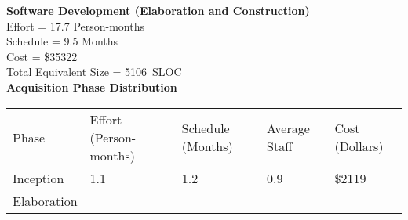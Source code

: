 \textbf{Software Development (Elaboration and
Construction)}\\[2\baselineskip]Effort = 17.7 Person-months\\
Schedule = 9.5 Months\\
Cost = \$35322\\[2\baselineskip]Total Equivalent Size =
5106~SLOC\\[2\baselineskip]\textbf{Acquisition Phase Distribution}\\
{ }

\begin{longtable}[c]{@{}lllll@{}}
\toprule
\begin{minipage}[t]{0.17\columnwidth}\raggedright\strut
Phase
\strut\end{minipage} &
\begin{minipage}[t]{0.17\columnwidth}\raggedright\strut
Effort (Person-months)
\strut\end{minipage} &
\begin{minipage}[t]{0.17\columnwidth}\raggedright\strut
Schedule (Months)
\strut\end{minipage} &
\begin{minipage}[t]{0.17\columnwidth}\raggedright\strut
Average Staff
\strut\end{minipage} &
\begin{minipage}[t]{0.17\columnwidth}\raggedright\strut
Cost (Dollars)
\strut\end{minipage}\tabularnewline
\begin{minipage}[t]{0.17\columnwidth}\raggedright\strut
Inception
\strut\end{minipage} &
\begin{minipage}[t]{0.17\columnwidth}\raggedright\strut
1.1
\strut\end{minipage} &
\begin{minipage}[t]{0.17\columnwidth}\raggedright\strut
1.2
\strut\end{minipage} &
\begin{minipage}[t]{0.17\columnwidth}\raggedright\strut
0.9
\strut\end{minipage} &
\begin{minipage}[t]{0.17\columnwidth}\raggedright\strut
\$2119
\strut\end{minipage}\tabularnewline
\begin{minipage}[t]{0.17\columnwidth}\raggedright\strut
Elaboration
\strut\end{minipage} &
\begin{minipage}[t]{0.17\columnwidth}\raggedright\strut

\end{minipage}
\end{longtable}
